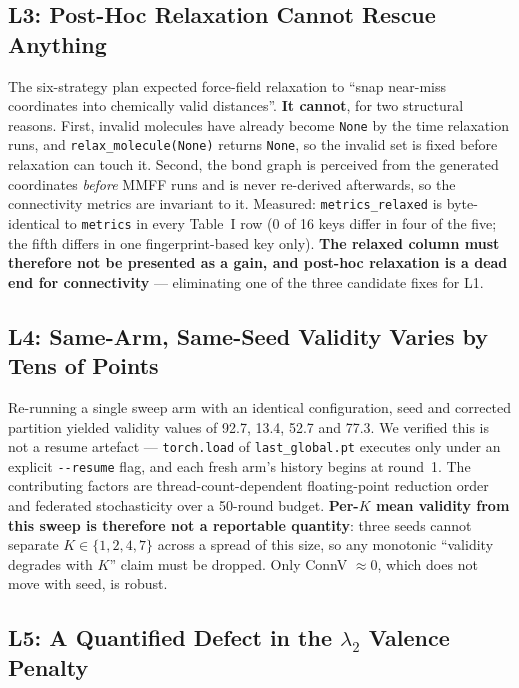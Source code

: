 \documentclass[12pt, a4paper]{article}
\begin{document}
\subsection{L3: Post-Hoc Relaxation Cannot Rescue Anything}

The six-strategy plan expected force-field relaxation to ``snap near-miss
coordinates into chemically valid distances''. \textbf{It cannot}, for two
structural reasons. First, invalid molecules have already become \texttt{None}
by the time relaxation runs, and \texttt{relax\_molecule(None)} returns
\texttt{None}, so the invalid set is fixed before relaxation can touch it.
Second, the bond graph is perceived from the generated coordinates \emph{before}
MMFF runs and is never re-derived afterwards, so the connectivity metrics are
invariant to it. Measured: \texttt{metrics\_relaxed} is byte-identical to
\texttt{metrics} in every Table~I row (0 of 16 keys differ in four of the five;
the fifth differs in one fingerprint-based key only). \textbf{The relaxed
column must therefore not be presented as a gain, and post-hoc relaxation is a
dead end for connectivity} --- eliminating one of the three candidate fixes
for L1.

\subsection{L4: Same-Arm, Same-Seed Validity Varies by Tens of Points}

Re-running a single sweep arm with an identical configuration, seed and
corrected partition yielded validity values of 92.7, 13.4, 52.7 and 77.3.
We verified this is not a resume artefact --- \texttt{torch.load} of
\texttt{last\_global.pt} executes only under an explicit \texttt{-{}-resume}
flag, and each fresh arm's history begins at round~1. The contributing factors
are thread-count-dependent floating-point reduction order and federated
stochasticity over a 50-round budget. \textbf{Per-$K$ mean validity from this
sweep is therefore not a reportable quantity}: three seeds cannot separate
$K \in \{1,2,4,7\}$ across a spread of this size, so any monotonic
``validity degrades with $K$'' claim must be dropped. Only ConnV $\approx 0$,
which does not move with seed, is robust.

\subsection{L5: A Quantified Defect in the \texorpdfstring{$\lambda_2$}{lambda2} Valence Penalty}
\end{document}
